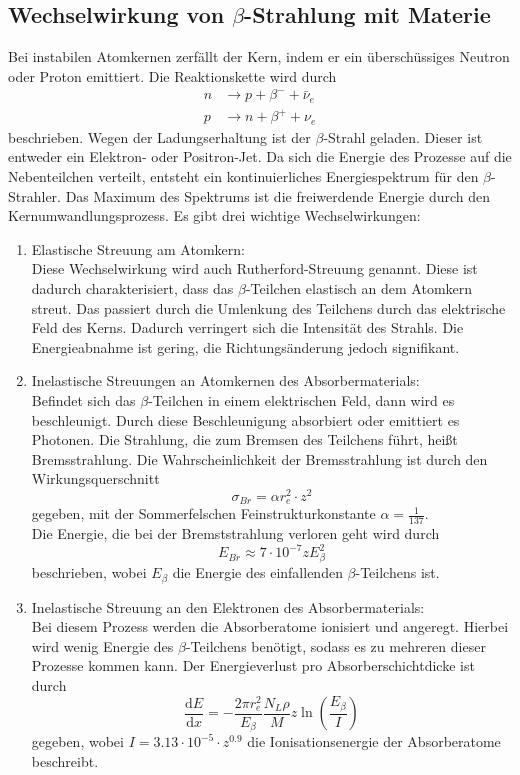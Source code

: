 \subsection{Wechselwirkung von $\beta$-Strahlung mit Materie}
Bei instabilen Atomkernen zerfällt der Kern, indem er ein überschüssiges Neutron oder Proton emittiert. Die Reaktionskette wird durch
\begin{align*}
  n &\rightarrow p+\beta^- + \bar\nu_e\\
  p &\rightarrow n+\beta^+ + \nu_e
\end{align*}
beschrieben. Wegen der Ladungserhaltung ist der $\beta$-Strahl geladen. Dieser ist entweder ein Elektron- oder Positron-Jet. Da sich die Energie des Prozesse auf die Nebenteilchen verteilt, entsteht ein kontinuierliches Energiespektrum für den $\beta$-Strahler. Das Maximum des Spektrums ist die freiwerdende Energie durch den Kernumwandlungsprozess. Es gibt drei wichtige Wechselwirkungen:
\begin{enumerate}[nosep,label=\textsc{\arabic*},leftmargin=*]
\item Elastische Streuung am Atomkern:\\
Diese Wechselwirkung wird auch Rutherford-Streuung genannt. Diese ist dadurch charakterisiert, dass das $\beta$-Teilchen elastisch an dem Atomkern streut. Das passiert durch die Umlenkung des Teilchens durch das elektrische Feld des Kerns. Dadurch verringert sich die Intensität des Strahls. Die Energieabnahme ist gering, die Richtungsänderung jedoch signifikant. 
\item Inelastische Streuungen an Atomkernen des Absorbermaterials:\\
Befindet sich das $\beta$-Teilchen in einem elektrischen Feld, dann wird es beschleunigt. Durch diese Beschleunigung absorbiert oder emittiert es Photonen. Die Strahlung, die zum Bremsen des Teilchens führt, heißt Bremsstrahlung. Die Wahrscheinlichkeit der Bremsstrahlung ist durch den Wirkungsquerschnitt
\begin{equation*}
  \sigma_{Br}=\alpha r_e^2\cdot z^2
\end{equation*}
gegeben, mit der Sommerfelschen Feinstrukturkonstante $\alpha=\frac{1}{137}$.\\
Die Energie, die bei der Bremststrahlung verloren geht wird durch 
\begin{equation*}
  E_{Br}\approx 7\cdot 10^{-7}zE_{\beta}^2
\end{equation*}
beschrieben, wobei $E_\beta$ die Energie des einfallenden $\beta$-Teilchens ist. 
\item Inelastische Streuung an den Elektronen des Absorbermaterials:\\
Bei diesem Prozess werden die Absorberatome ionisiert und angeregt. Hierbei wird wenig Energie des $\beta$-Teilchens benötigt, sodass es zu mehreren dieser Prozesse kommen kann. Der Energieverlust pro Absorberschichtdicke ist durch
\begin{equation*}
  \frac{\textrm{d}E}{\textrm{d}x}=-\frac{2\pi r_e^2}{E_\beta}\frac{N_L \rho}{M}z\ln(\frac{E_\beta}{I})
\end{equation*}
gegeben, wobei $I=3.13\cdot 10^{-5}\cdot z^{0.9}$ die Ionisationsenergie der Absorberatome beschreibt. 
\end{enumerate}
